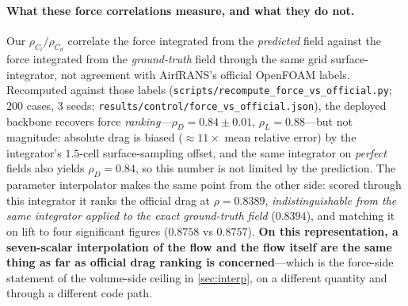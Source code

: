 \paragraph{What these force correlations measure, and what they do not.} Our
$\rho_{C_l}/\rho_{C_d}$ correlate the force integrated from the \emph{predicted} field
against the force integrated from the \emph{ground-truth} field through the same grid
surface-integrator, not agreement with AirfRANS's official OpenFOAM labels. Recomputed
against those labels (\texttt{scripts\slash{}recompute\_force\_vs\_official.py}; 200 cases, 3
seeds; \texttt{results\slash{}control\slash{}force\_vs\_official.json}), the deployed backbone recovers
force \emph{ranking}---$\rho_D=0.84{\pm}0.01$, $\rho_L=0.88$---but not magnitude: absolute
drag is biased ($\approx 11\times$ mean relative error) by the integrator's $1.5$-cell
surface-sampling offset, and the same integrator on \emph{perfect} fields also yields
$\rho_D=0.84$, so this number is not limited by the prediction. The parameter interpolator
makes the same point from the other side: scored through this integrator it ranks the
official drag at $\rho=0.8389$, \emph{indistinguishable from the same integrator applied
to the exact ground-truth field} ($0.8394$), and matching it on lift to four significant
figures ($0.8758$ vs $0.8757$). \textbf{On this representation, a seven-scalar
interpolation of the flow and the flow itself are the same thing as far as official drag
ranking is concerned}---which is the force-side statement of the volume-side ceiling in
\autoref{sec:interp}, on a different quantity and through a different code path.

